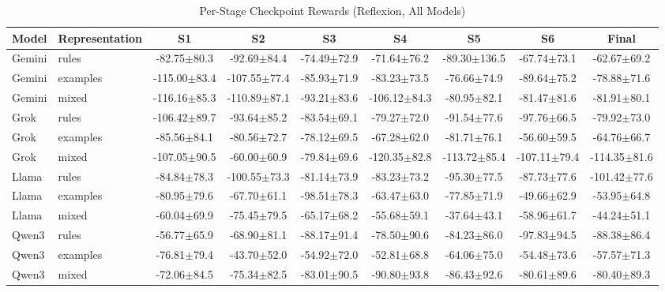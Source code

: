 \documentclass[sigconf]{acmart}
\begin{document}
\begin{table}[htbp]
\centering
\caption{Per-Stage Checkpoint Rewards (Reflexion, All Models)}
\label{tab:stage-checkpoints-indiv}
\scriptsize
\begin{tabular}{llccccccc}
\toprule
\textbf{Model} & \textbf{Representation} & \textbf{S1} & \textbf{S2} & \textbf{S3} & \textbf{S4} & \textbf{S5} & \textbf{S6} & \textbf{Final} \\
\midrule
Gemini & rules & -82.75$\pm$80.3 & -92.69$\pm$84.4 & -74.49$\pm$72.9 & -71.64$\pm$76.2 & -89.30$\pm$136.5 & -67.74$\pm$73.1 & -62.67$\pm$69.2 \\
Gemini & examples & -115.00$\pm$83.4 & -107.55$\pm$77.4 & -85.93$\pm$71.9 & -83.23$\pm$73.5 & -76.66$\pm$74.9 & -89.64$\pm$75.2 & -78.88$\pm$71.6 \\
Gemini & mixed & -116.16$\pm$85.3 & -110.89$\pm$87.1 & -93.21$\pm$83.6 & -106.12$\pm$84.3 & -80.95$\pm$82.1 & -81.47$\pm$81.6 & -81.91$\pm$80.1 \\
\midrule
Grok & rules & -106.42$\pm$89.7 & -93.64$\pm$85.2 & -83.54$\pm$69.1 & -79.27$\pm$72.0 & -91.54$\pm$77.6 & -97.76$\pm$66.5 & -79.92$\pm$73.0 \\
Grok & examples & -85.56$\pm$84.1 & -80.56$\pm$72.7 & -78.12$\pm$69.5 & -67.28$\pm$62.0 & -81.71$\pm$76.1 & -56.60$\pm$59.5 & -64.76$\pm$66.7 \\
Grok & mixed & -107.05$\pm$90.5 & -60.00$\pm$60.9 & -79.84$\pm$69.6 & -120.35$\pm$82.8 & -113.72$\pm$85.4 & -107.11$\pm$79.4 & -114.35$\pm$81.6 \\
\midrule
Llama & rules & -84.84$\pm$78.3 & -100.55$\pm$73.3 & -81.14$\pm$73.9 & -83.23$\pm$73.2 & -95.30$\pm$77.5 & -87.73$\pm$77.6 & -101.42$\pm$77.6 \\
Llama & examples & -80.95$\pm$79.6 & -67.70$\pm$61.1 & -98.51$\pm$78.3 & -63.47$\pm$63.0 & -77.85$\pm$71.9 & -49.66$\pm$62.9 & -53.95$\pm$64.8 \\
Llama & mixed & -60.04$\pm$69.9 & -75.45$\pm$79.5 & -65.17$\pm$68.2 & -55.68$\pm$59.1 & -37.64$\pm$43.1 & -58.96$\pm$61.7 & -44.24$\pm$51.1 \\
\midrule
Qwen3 & rules & -56.77$\pm$65.9 & -68.90$\pm$81.1 & -88.17$\pm$91.4 & -78.50$\pm$90.6 & -84.23$\pm$86.0 & -97.83$\pm$94.5 & -88.38$\pm$86.4 \\
Qwen3 & examples & -76.81$\pm$79.4 & -43.70$\pm$52.0 & -54.92$\pm$72.0 & -52.81$\pm$68.8 & -64.06$\pm$75.0 & -54.48$\pm$73.6 & -57.57$\pm$71.3 \\
Qwen3 & mixed & -72.06$\pm$84.5 & -75.34$\pm$82.5 & -83.01$\pm$90.5 & -90.80$\pm$93.8 & -86.43$\pm$92.6 & -80.61$\pm$89.6 & -80.40$\pm$89.3 \\
\bottomrule
\end{tabular}
\end{table}
\end{document}
